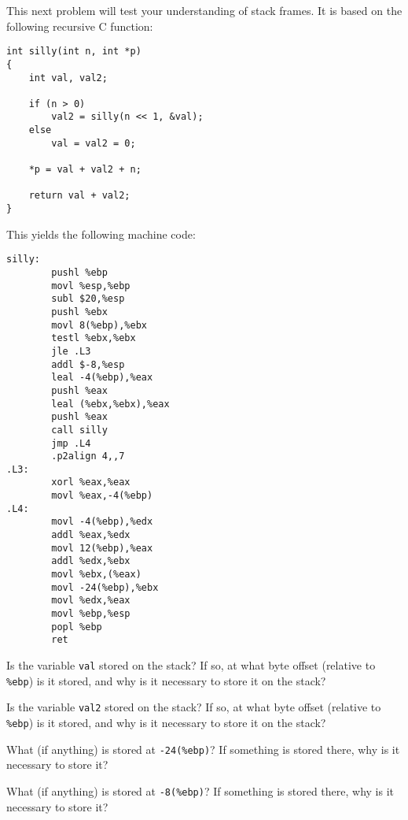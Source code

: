 This next problem will test your understanding of stack frames.  It is
based on the following recursive C function:

{\small\begin{verbatim}
int silly(int n, int *p)
{
    int val, val2;

    if (n > 0)
        val2 = silly(n << 1, &val);
    else
        val = val2 = 0;

    *p = val + val2 + n;

    return val + val2;
}
\end{verbatim}}

This yields the following machine code:

{\small\begin{verbatim}
silly:
        pushl %ebp
        movl %esp,%ebp
        subl $20,%esp
        pushl %ebx
        movl 8(%ebp),%ebx
        testl %ebx,%ebx
        jle .L3
        addl $-8,%esp
        leal -4(%ebp),%eax
        pushl %eax
        leal (%ebx,%ebx),%eax
        pushl %eax
        call silly
        jmp .L4
        .p2align 4,,7
.L3:
        xorl %eax,%eax
        movl %eax,-4(%ebp)
.L4:
        movl -4(%ebp),%edx
        addl %eax,%edx
        movl 12(%ebp),%eax
        addl %edx,%ebx
        movl %ebx,(%eax)
        movl -24(%ebp),%ebx
        movl %edx,%eax
        movl %ebp,%esp
        popl %ebp
        ret
\end{verbatim}}

\newpage

\begin{problem}{6}

\begin{choice}

\item
Is the variable {\tt val} stored on the stack? If so, at what byte offset
(relative to {\tt \%ebp}) is it stored, and why is it necessary to store it
on the stack?

\vspace{1.0 in}

\item
Is the variable {\tt val2} stored on the stack? If so, at what byte offset
(relative to {\tt \%ebp}) is it stored, and why is it necessary to store it
on the stack?

\vspace{1.0 in}

\item 
What (if anything) is stored at {\tt -24(\%ebp)}?
If something is stored there, why is it necessary to store it?

\vspace{0.5 in}


\item 
What (if anything) is stored at {\tt -8(\%ebp)}?
If something is stored there, why is it necessary to store it?

\vspace{0.5 in}

\end{choice}

\end{problem}
